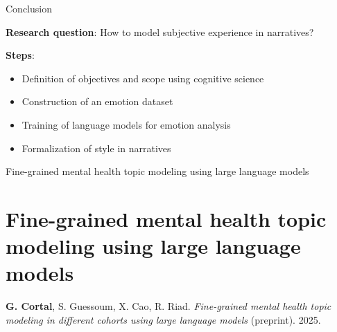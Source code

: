 \documentclass[handout,10pt]{beamer}
\begin{document}
\begin{frame}{Conclusion}

\textbf{Research question}: How to model subjective experience in narratives?

\vspace{0.5cm}
\pause

\textbf{Steps}:

\begin{itemize}[<+->]
    \item Definition of objectives and scope using cognitive science
    \item Construction of an emotion dataset 
    \item Training of language models for emotion analysis 
    \item Formalization of style in narratives
\end{itemize}

\vspace{0.5cm}


    
\end{frame}

\begin{frame}{}
\Large
\begin{center}
    Fine-grained mental health topic modeling using large language models
    \section{Fine-grained mental health topic modeling using large language models}
\end{center}

\vspace{1.5cm}

\footnotesize

\textbf{G. Cortal}, S. Guessoum, X. Cao, R. Riad. \textit{Fine-grained mental health topic modeling in different cohorts using large language models} (preprint). 2025. 

\end{frame}
\end{document}

